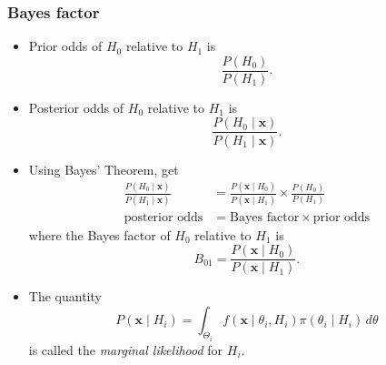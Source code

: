 \documentclass[../ds]{subfiles}
\begin{document}
\subsubsection{Bayes factor}
\begin{itemize}
	\item Prior odds of $H_0$ relative to $H_1$ is \[ \frac{P(H_0)}{P(H_1)}. \]
	\item Posterior odds of $H_0$ relative to $H_1$ is \[ \frac{P(H_0 \mid \mathbf{x})}{P(H_1 \mid \mathbf{x})}. \]
	\item Using Bayes' Theorem, get 
	\begin{align*}
		\frac{P(H_0 \mid \mathbf{x})}{P(H_1 \mid \mathbf{x})} &= \frac{P(\mathbf{x} \mid H_0)}{P(\mathbf{x} \mid H_1)} \times \frac{P(H_0)}{P(H_1)} \\
		\text{posterior odds} &= \text{Bayes factor} \times \text{prior odds}
	\end{align*}
	where the Bayes factor of $H_0$ relative to $H_1$ is
	\[ B_{01} = \frac{P(\mathbf{x} \mid H_0)}{P(\mathbf{x} \mid H_1)}.\]
	\item The quantity
	\[ P(\mathbf{x} \mid H_i) = \int_{\Theta_i} f(\mathbf{x} \mid \theta_i,H_i) \pi(\theta_i \mid H_i)\,d\theta \]
	is called the \textit{marginal likelihood} for $H_i.$
\end{itemize}
\end{document}
